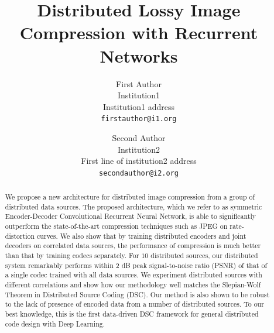 \documentclass[10pt,twocolumn,letterpaper]{article}
\begin{document}
\title{Distributed Lossy Image Compression with Recurrent Networks}

\author{First Author\\
Institution1\\
Institution1 address\\
{\tt\small firstauthor@i1.org}
\and
Second Author\\
Institution2\\
First line of institution2 address\\
{\tt\small secondauthor@i2.org}
}

\maketitle


\begin{abstract}
We propose a new architecture for distributed image compression from a group of distributed data sources. The proposed architecture, which we refer to as symmetric Encoder-Decoder Convolutional Recurrent Neural Network, is able to significantly outperform the state-of-the-art compression techniques such as JPEG on rate-distortion curves. We also show that by training distributed encoders and joint decoders on correlated data sources, the performance of compression is much better than that by training codecs separately. For $10$ distributed sources, our distributed system remarkably performs within 2 dB peak signal-to-noise ratio (PSNR) of that of a single codec trained with all data sources. We experiment distributed sources with different correlations and show how our methodology well matches the Slepian-Wolf Theorem in Distributed Source Coding (DSC). Our method is also shown to be robust to the lack of presence of encoded data from a number of distributed sources. To our best knowledge, this is the first data-driven DSC framework for general distributed code design with Deep Learning.

\end{abstract}

\end{document}
